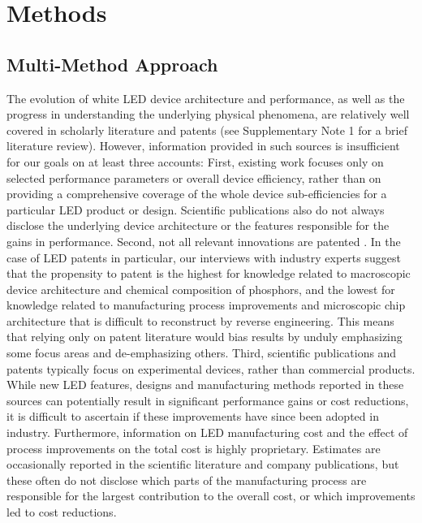 \documentclass[parskip=full]{article}
\begin{document}
\section{Methods}
\label{sec:methods}

\subsection{Multi-Method Approach}

The evolution of white LED device architecture and performance, as well as the progress in understanding the underlying physical phenomena, are relatively well covered in scholarly literature and patents (see Supplementary Note 1 for a brief literature review). However, information provided in such sources is insufficient for our goals on at least three accounts: First, existing work focuses only on selected performance parameters or overall device efficiency, rather than on providing a comprehensive coverage of the whole device sub-efficiencies for a particular LED product or design. Scientific publications also do not always disclose the underlying device architecture or the features responsible for the gains in performance. Second, not all relevant innovations are patented \cite{Pakes_1980,Fontana_2013}. In the case of LED patents in particular, our interviews with industry experts suggest that the propensity to patent is the highest for knowledge related to macroscopic device architecture and chemical composition of phosphors, and the lowest for knowledge related to manufacturing process improvements and microscopic chip architecture that is difficult to reconstruct by reverse engineering. This means that relying only on patent literature would bias results by unduly emphasizing some focus areas and de-emphasizing others. Third, scientific publications and patents typically focus on experimental devices, rather than commercial products. While new LED features, designs and manufacturing methods reported in these sources can potentially result in significant performance gains or cost reductions, it is difficult to ascertain if these improvements have since been adopted in industry. Furthermore, information on LED manufacturing cost and the effect of process improvements on the total cost is highly proprietary. Estimates are occasionally reported in the scientific literature and company publications, but these often do not disclose which parts of the manufacturing process are responsible for the largest contribution to the overall cost, or which improvements led to cost reductions.
\end{document}
